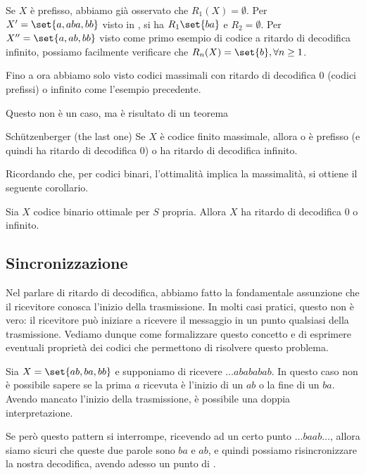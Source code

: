 \begin{example}{}
  Se \(X\) è prefisso, abbiamo già osservato che \(R_1(X) = \emptyset\).
  Per \(X' = \set{a,aba,bb}\) visto in , si ha \(R_1\set{ba}\) e \(R_2 = \emptyset\).
  Per \(X''=\set{a, ab, bb}\) visto come primo esempio di codice a ritardo di decodifica infinito, possiamo facilmente verificare che \(R_n(X) = \set{b}, \forall n \geq 1\).
\end{example}

Fino a ora abbiamo solo visto codici massimali con ritardo di decodifica \(0\) (codici prefissi) o infinito come l'esempio precedente.

Questo non è un caso, ma è risultato di un teorema

\begin{theorem}{Schützenberger (the last one)}
  Se \(X\) è codice finito massimale, allora o è prefisso (e quindi ha ritardo di decodifica \(0\)) o ha ritardo di decodifica infinito.
\end{theorem}

Ricordando che, per codici binari, l'ottimalità implica la massimalità, si ottiene il seguente corollario.

\begin{corollary}{}
  Sia \(X\) codice binario ottimale per \(S\) propria. Allora \(X\) ha ritardo di decodifica \(0\) o infinito.
\end{corollary}

\subsection{Sincronizzazione}

Nel parlare di ritardo di decodifica, abbiamo fatto la fondamentale assunzione che il ricevitore conosca l'inizio della trasmissione.
In molti casi pratici, questo non è vero: il ricevitore può iniziare a ricevere il messaggio in un punto qualsiasi della trasmissione.
Vediamo dunque come formalizzare questo concetto e di esprimere eventuali proprietà dei codici che permettono di risolvere questo problema.

Sia \(X = \set{ab,ba,bb}\) e supponiamo di ricevere \(\ldots abababab\). 
In questo caso non è possibile sapere se la prima \(a\) ricevuta è l'inizio di un \(ab\) o la fine di un \(ba\).
Avendo mancato l'inizio della trasmissione, è possibile una doppia interpretazione.

Se però questo pattern si interrompe, ricevendo ad un certo punto \(\ldots baab \ldots\), allora siamo sicuri che queste due parole sono \(ba\) e \(ab\), e quindi possiamo risincronizzare la nostra decodifica, avendo adesso un punto di .

